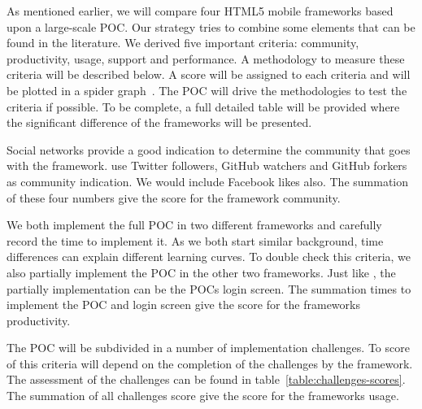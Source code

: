 \documentclass[a4paper]{artikel3}
\renewcommand{\paragraph}[1]{\vspace{2mm} \noindent {\bf #1}  }
\begin{document}
As mentioned earlier,  we will compare four HTML5 mobile frameworks based upon a large-scale POC.  Our strategy tries to combine some elements that can be found in the literature.  We derived five important criteria:  community,  productivity,  usage,  support and performance.  A methodology to measure these criteria will be described below.  A score will be assigned to each criteria and will be plotted in a spider graph~\cite{Few2005}.   The POC will drive the methodologies to test the criteria if possible.  To be complete,  a full detailed table will be provided where the significant difference of the frameworks will be presented. 	


\paragraph{Community}%
Social networks provide a good indication to determine the community that goes with the framework.  \cite{Sarrafi2012a,Ayuso2012} use Twitter followers,  GitHub watchers and GitHub forkers as community indication.  We would include Facebook likes also.  The summation of these four numbers give the score for the framework community.  


\paragraph{Productivity}%
We both implement the full POC in two different frameworks and carefully record the time to implement it.  As we both start similar background,  time differences can explain different learning curves.  To double check this criteria,  we also partially implement the POC in the other two frameworks.  Just like \cite{Burris},  the partially implementation can be the POCs login screen.  
The summation times to implement the POC and login screen give the score for the frameworks productivity.  

\paragraph{Usage}%
The POC will be subdivided in a number of implementation challenges.  To score of this criteria will depend on the completion of the challenges by the framework.  The assessment of the challenges can be found in table~\ref{table:challenges-scores}.  The summation of all challenges score give the score for the frameworks usage.
\end{document}

